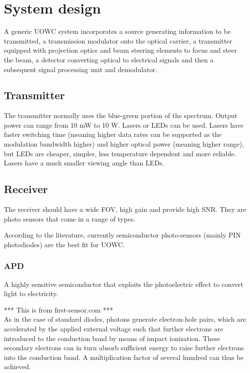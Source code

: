 
\section{System design}
A generic \ac{UOWC} system incorporates a source generating information to be
transmitted, a transmission modulator onto the optical carrier, a transmitter
equipped with projection optics and beam steering elements to focus and steer
the beam, a detector converting optical to electrical signals and then a
subsequent signal processing unit and demodulator.

\subsection{Transmitter}
The transmitter normally uses the blue-green portion of the spectrum.
Output power can range from 10 mW to 10 W. Lasers or \ac{LED}s can be used.
Lasers have faster switching time (meaning higher data rates can be supported
as the modulation bandwidth higher) and higher optical power (meaning higher
range), but \ac{LED}s are cheaper, simpler, less temperature dependent and
more reliable. Lasers have a much smaller viewing angle than \ac{LED}s.

\subsection{Receiver}
The receiver should have a wide \ac{FOV}, high gain and provide high \ac{SNR}.
They are photo sensors that come in a range of types.

According to the literature, currently semiconductor photo-sensors (mainly
\ac{PIN} photodiodes) are the best fit for \ac{UOWC}.

\subsubsection{\ac{APD}}
A highly sensitive semiconductor that exploits the photoelectric effect to
convert light to electricity.

*** This is from first-sensor.com *** \\
As in the case of standard diodes, photons generate electron-hole pairs,
which are accelerated by the applied external voltage such that further
electrons are introduced to the conduction band by means of impact ionization.
These secondary electrons can in turn absorb sufficient energy to raise further
electrons into the conduction band. A multiplication factor of several hundred
can thus be achieved.

